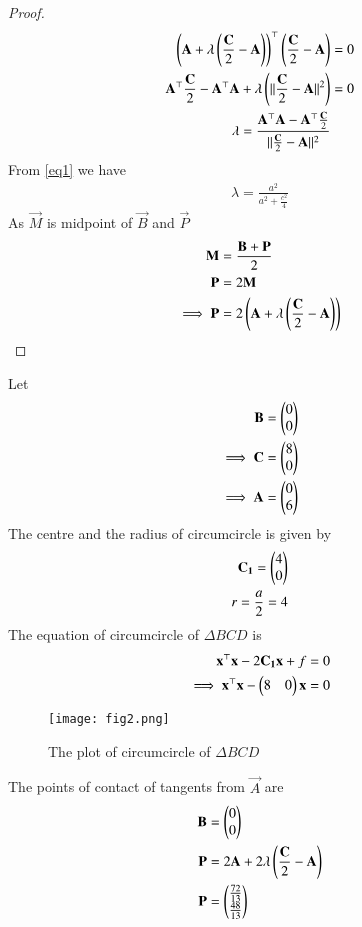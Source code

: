 \documentclass[journal,12pt,twocolumn]{IEEEtran}
\begin{document}
\begin{proof}
\begin{align}
    \left(\mathbf{A}+\lambda\left(\frac{\mathbf{C}}{2}-\mathbf{A}\right)\right)^\top\left(\frac{\mathbf{C}}{2}-\mathbf{A}\right)&=0\\
    \mathbf{A}^\top\frac{\mathbf{C}}{2}-\mathbf{A}^\top\mathbf{A}+\lambda\left(\lVert\frac{\mathbf{C}}{2}-\mathbf{A}\rVert^2\right)&=0\\
    \lambda=\frac{\mathbf{A}^\top\mathbf{A}-\mathbf{A}^\top\frac{\mathbf{C}}{2}}{\lVert\frac{\mathbf{C}}{2}-\mathbf{A}\rVert^2}
\end{align}
From \ref{eq1} we have
\begin{align}
    \lambda=\frac{a^{2}}{a^{2}+\frac{c^{2}}{4}}
\end{align}
As $\vec{M}$ is midpoint of $\vec{B}$ and $\vec{P}$
\begin{align}
    \mathbf{M}&=\frac{\mathbf{B}+\mathbf{P}}{2}\\
    \mathbf{P}&=2\mathbf{M}\\
    \implies \mathbf{P}&=2\left(\mathbf{A}+\lambda\left(\frac{\mathbf{C}}{2}-\mathbf{A}\right)\right)
\end{align}

\end{proof}
Let
\begin{align}
    \mathbf{B}=\begin{pmatrix}0\\0\end{pmatrix}\\
    \implies \mathbf{C}=\begin{pmatrix}8\\0\end{pmatrix}\\
    \implies  \mathbf{A}=\begin{pmatrix}0\\6\end{pmatrix}
\end{align}
The centre and the radius of circumcircle is given by 
\begin{align}
    \mathbf{C_1}=\begin{pmatrix}4\\0\end{pmatrix}\\
    r = \frac{a}{2}=4
\end{align}
The equation of circumcircle of $\Delta BCD$ is 
\begin{align}
    \mathbf{x}^\top\mathbf{x}-2\mathbf{C_1}\mathbf{x}+f &=0\\
    \implies \mathbf{x}^\top\mathbf{x}-\begin{pmatrix}8&0\end{pmatrix}\mathbf{x}&=0
    \label{eq4}
\end{align}
\begin{figure}[!ht]
   \centering
   \texttt{[image: fig2.png]}
   \caption{The plot of circumcircle of $\Delta BCD$}
\end{figure}
The points of contact of tangents from $\vec{A}$ are
\begin{align}
    \mathbf{B}&=\begin{pmatrix}0\\0\end{pmatrix}\\
    \mathbf{P}&=2\mathbf{A}+2\lambda\left(\frac{\mathbf{C}}{2}-\mathbf{A}\right)\\
    \mathbf{P}&=\begin{pmatrix}\frac{72}{13}\\ \frac{48}{13}\end{pmatrix}
\end{align}
\end{document}
